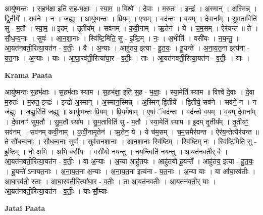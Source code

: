 \documentclass[17pt]{extarticle}
\begin{document}
आयु॑ष्मन्तः । स॒हभ॑क्षा॒ इति॑ स॒ह-भ॒क्षाः॒ । स्या॒म॒ ॥ विश्वे᳚ । दे॒वाः । म॒रुतः॑ । इन्द्रः॑ । अ॒स्मान् । अ॒स्मिन्न् । द्वि॒तीये᳚ । सव॑ने । न । ज॒ह्युः॒ ॥ आयु॑ष्मन्तः । प्रि॒यम् । ए॒षा॒म् । वद॑न्तः । व॒यम् । दे॒वाना᳚म् । सु॒म॒ताविति॑ सु - म॒तौ । स्या॒म॒ ॥ इ॒दम् । तृ॒तीय᳚म् । सव॑नम् । क॒वी॒नाम् । ऋ॒तेन॑ । ये । च॒म॒सम् । ऐर॑यन्त ॥ ते । सौ॒ध॒न्व॒नाः । सुवः॑ । आ॒न॒शा॒नाः । स्वि॑ष्टि॒मिति॒ सु - इ॒ष्टि॒म् । नः॒ । अ॒भीति॑ । वसी॑यः । न॒य॒न्तु॒ ॥ आ॒यत॑नवती॒रित्या॒यत॑न - व॒तीः॒ । वै । अ॒न्याः । आहु॑तय॒ इत्या - हु॒त॒यः॒ । हू॒यन्ते᳚ । अ॒ना॒य॒त॒ना इत्य॑ना - य॒त॒नाः । अ॒न्याः । याः । आ॒घा॒रव॑ती॒रित्या॑घा॒र - व॒तीः॒ । ताः । आ॒यत॑नवती॒रित्या॒यत॑न - व॒तीः॒ । याः ।  \newline


\textbf{Krama Paata} \newline

आयु॑ष्मन्तः स॒हभ॑क्षाः । स॒हभ॑क्षाः स्याम । स॒हभ॑क्षा॒ इति॑ स॒ह - भ॒क्षाः॒ । स्या॒मेति॑ स्याम ॥ विश्वे॑ दे॒वाः । दे॒वा म॒रुतः॑ । म॒रुत॒ इन्द्रः॑ । इन्द्रो॑ अ॒स्मान् । अ॒स्मान॒स्मिन्न् । अ॒स्मिन् द्वि॒तीये᳚ । द्वि॒तीये॒ सव॑ने । सव॑ने॒ न । न ज॑ह्युः । ज॒ह्यु॒रिति॑ जह्युः ॥ आयु॑ष्मन्तः प्रि॒यम् । प्रि॒यमे॑षाम् । ए॒षां॒ ॅवद॑न्तः । वद॑न्तो व॒यम् । व॒यम् दे॒वाना᳚म् । दे॒वानाꣳ॑ सुम॒तौ । सु॒म॒तौ स्या॑म । सु॒म॒ताविति॑ सु - म॒तौ । स्या॒मेति॑ स्याम ॥ इ॒दम् तृ॒तीय᳚म् । तृ॒तीयꣳ॒॒ सव॑नम् । सव॑नम् कवी॒नाम् । क॒वी॒नामृ॒तेन॑ । ऋ॒तेन॒ ये । ये च॑म॒सम् । च॒म॒समैर॑यन्त । ऐर॑य॒न्तेत्यैर॑यन्त ॥ ते सौ॑धन्व॒नाः । सौ॒ध॒न्व॒नाः सुवः॑ । सुव॑रानशा॒नाः । आ॒न॒शा॒नाः स्वि॑ष्टिम् । स्वि॑ष्टिम् नः । स्वि॑ष्टि॒मिति॒ सु - इ॒ष्टि॒म् । नो॒ अ॒भि । अ॒भि वसी॑यः । वसी॑यो नयन्तु । न॒य॒न्त्विति॑ नयन्तु ॥ आ॒यत॑नवती॒र् वै । आ॒यत॑नवती॒रित्या॒यत॑न - व॒तीः॒ । वा अ॒न्याः । अ॒न्या आहु॑तयः । आहु॑तयो हू॒यन्ते᳚ । आहु॑तय॒ इत्या - हु॒त॒यः॒ । हू॒यन्ते॑ ऽनायत॒नाः । अ॒ना॒य॒त॒ना अ॒न्याः । अ॒ना॒य॒त॒ना इत्य॑ना - य॒त॒नाः । अ॒न्या याः । या आ॑घा॒रव॑तीः । आ॒घा॒रव॑ती॒ स्ताः । आ॒घा॒रव॑ती॒रित्या॑घा॒र - व॒तीः॒ । ता आ॒यत॑नवतीः । आ॒यत॑नवती॒र् याः । आ॒यत॑नवती॒रित्या॒यत॑न - व॒तीः॒ । याः सौ॒म्याः \newline

\textbf{Jatai Paata} \newline
\end{document}
